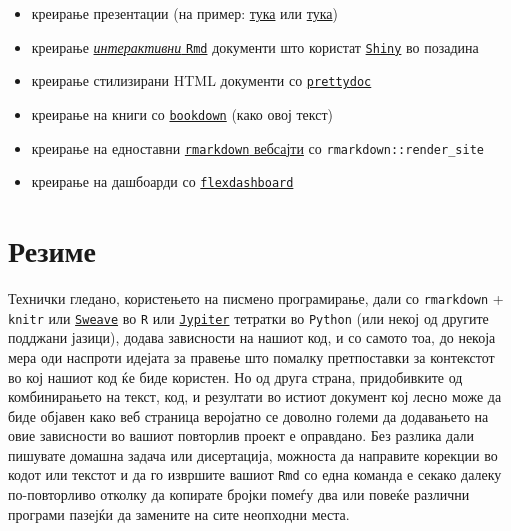 \documentclass[
]{book}
\providecommand{\tightlist}{%
  \setlength{\itemsep}{0pt}\setlength{\parskip}{0pt}}
\begin{document}
\begin{itemize}
\tightlist
\item
  креирање презентации (на пример: \href{https://rmarkdown.rstudio.com/lesson-11.html}{тука} или \href{https://bookdown.org/yihui/rmarkdown/xaringan.html}{тука})
\item
  креирање \href{https://rmarkdown.rstudio.com/lesson-14.html}{\emph{интерактивни} \texttt{Rmd}} документи што користат \href{https://shiny.rstudio.com/}{\texttt{Shiny}} \citep{R-shiny} во позадина
\item
  креирање стилизирани HTML документи со \href{https://prettydoc.statr.me/}{\texttt{prettydoc}}
\item
  креирање на книги со \href{https://bookdown.org/}{\texttt{bookdown}} (како овој текст)
\item
  креирање на едноставни \href{https://rmarkdown.rstudio.com/lesson-13.html}{\texttt{rmarkdown} вебсајти} со \texttt{rmarkdown::render\_site}
\item
  креирање на дашбоарди со \href{https://rmarkdown.rstudio.com/lesson-12.html}{\texttt{flexdashboard}}
\end{itemize}

\hypertarget{ux440ux435ux437ux438ux43cux435-3}{%
\section{Резиме}\label{ux440ux435ux437ux438ux43cux435-3}}

Технички гледано, користењето на писмено програмирање, дали со \texttt{rmarkdown} + \texttt{knitr} или \href{https://www.rdocumentation.org/packages/utils/versions/3.6.2/topics/Sweave}{\texttt{Sweave}} во \texttt{R} или \href{https://jupyter.org/}{\texttt{Jypiter}} тетратки во \texttt{Python} (или некој од другите подджани јазици), додава зависности на нашиот код, и со самото тоа, до некоја мера оди наспроти идејата за правење што помалку претпоставки за контекстот во кој нашиот код ќе биде користен. Но од друга страна, придобивките од комбинирањето на текст, код, и резултати во истиот документ кој лесно може да биде објавен како веб страница веројатно се доволно големи да додавањето на овие зависности во вашиот повторлив проект е оправдано. Без разлика дали пишувате домашна задача или дисертација, можноста да направите корекции во кодот или текстот и да го извршите вашиот \texttt{Rmd} со една команда е секако далеку по-повторливо отколку да копирате бројки помеѓу два или повеќе различни програми пазејќи да замените на сите неопходни места.
\end{document}
